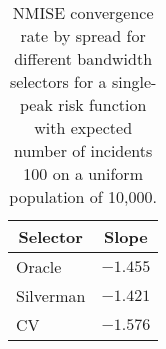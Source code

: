 \begin{table}[htbp]
\begin{center}
\begin{tabular}{lr}
\hline\hline
\multicolumn{1}{c}{Selector}&\multicolumn{1}{c}{Slope}\tabularnewline
\hline
Oracle&$-1.455$\tabularnewline
Silverman&$-1.421$\tabularnewline
CV&$-1.576$\tabularnewline
\hline
\end{tabular}
\caption[NMISE Convergence rate by spread for 100 cases]{NMISE convergence rate by spread for different bandwidth selectors for a single-peak risk function with expected number of incidents 100 on a uniform population of 10,000.\label{tab:results:nmise_convergence_by_cases_spread}}\end{center}
\end{table}
